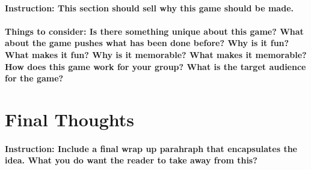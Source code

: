 \documentclass[12pt, twocolumn]{article}
\begin{document}
\paragraph{Instruction: This section should sell why this game should be made.}

\paragraph{Things to consider: Is there something unique about this game? What about the game pushes what has been done before? Why is it fun? What makes it fun? Why is it memorable? What makes it memorable? How does this game work for your group? What is the target audience for the game?}

\section*{Final Thoughts}

\paragraph{Instruction: Include a final wrap up parahraph that encapsulates the idea. What you do want the reader to take away from this?}
\end{document}
